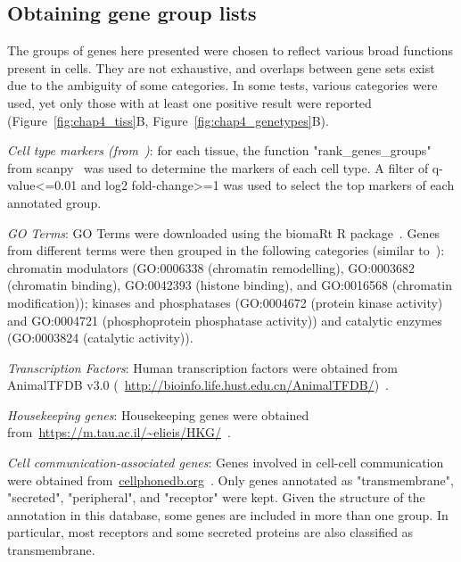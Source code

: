 \subsection{Obtaining gene group lists}
\label{section4.4_genelists}
The groups of genes here presented were chosen to reflect various broad functions present in cells. They are not exhaustive, and overlaps between gene sets exist due to the ambiguity of some categories. In some tests, various categories were used, yet only those with at least one positive result were reported (Figure~\ref{fig:chap4_tiss}B, Figure~\ref{fig:chap4_genetypes}B).

\textit{Cell type markers (from~\citep{madissoon_lung_2019})}: for each tissue, the function "rank\_genes\_groups" from scanpy~\citep{wolf_scanpy:_2018} was used to determine the markers of each cell type. A filter of q-value<=0.01 and log2 fold-change>=1 was used to select the top markers of each annotated group.

\textit{GO Terms}: GO Terms were downloaded using the biomaRt R package~\citep{durinck_mapping_2009}. Genes from different terms were then grouped in the following categories (similar to~\citep{hagai_gene_2018}): chromatin modulators (GO:0006338 (chromatin remodelling), GO:0003682 (chromatin binding), GO:0042393 (histone binding), and GO:0016568 (chromatin modification)); kinases and phosphatases (GO:0004672 (protein kinase activity) and GO:0004721 (phosphoprotein phosphatase activity)) and catalytic enzymes (GO:0003824 (catalytic activity)).

\textit{Transcription Factors}: Human transcription factors were obtained from AnimalTFDB v3.0 (~\url{http://bioinfo.life.hust.edu.cn/AnimalTFDB/})~\citep{hu_animaltfdb_2019}.

\textit{Housekeeping genes}: Housekeeping genes were obtained from~\url{https://m.tau.ac.il/~elieis/HKG/}~\citep{eisenberg_human_2013}.

\textit{Cell communication-associated genes}: Genes involved in cell-cell communication were obtained from~\url{cellphonedb.org}~\citep{efremova_cellphonedb_2019}. Only genes annotated as "transmembrane", "secreted", "peripheral", and "receptor" were kept. Given the structure of the annotation in this database, some genes are included in more than one group. In particular, most receptors and some secreted proteins are also classified as transmembrane.

